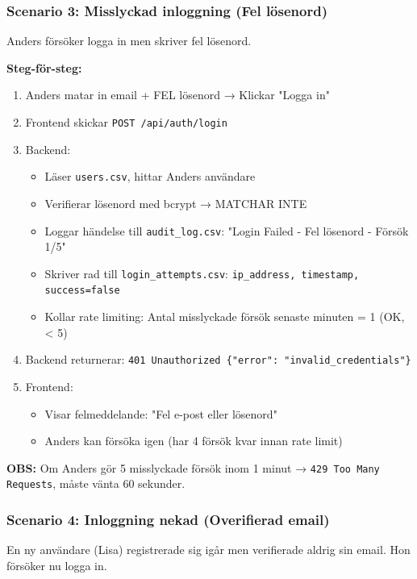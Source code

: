 \documentclass[12pt,a4paper]{article}
\begin{document}
\subsubsection{Scenario 3: Misslyckad inloggning (Fel lösenord)}

Anders försöker logga in men skriver fel lösenord.

\textbf{Steg-för-steg:}
\begin{enumerate}[noitemsep]
  \item Anders matar in email + FEL lösenord → Klickar "Logga in"
  \item Frontend skickar \texttt{POST /api/auth/login}
  \item Backend:
  \begin{itemize}[noitemsep]
    \item Läser \texttt{users.csv}, hittar Anders användare
    \item Verifierar lösenord med bcrypt → MATCHAR INTE
    \item Loggar händelse till \texttt{audit\_log.csv}: "Login Failed - Fel lösenord - Försök 1/5"
    \item Skriver rad till \texttt{login\_attempts.csv}: \texttt{ip\_address, timestamp, success=false}
    \item Kollar rate limiting: Antal misslyckade försök senaste minuten = 1 (OK, < 5)
  \end{itemize}
  \item Backend returnerar: \texttt{401 Unauthorized \{"error": "invalid\_credentials"\}}
  \item Frontend:
  \begin{itemize}[noitemsep]
    \item Visar felmeddelande: "Fel e-post eller lösenord"
    \item Anders kan försöka igen (har 4 försök kvar innan rate limit)
  \end{itemize}
\end{enumerate}

\textbf{OBS:} Om Anders gör 5 misslyckade försök inom 1 minut → \texttt{429 Too Many Requests}, måste vänta 60 sekunder.

\subsubsection{Scenario 4: Inloggning nekad (Overifierad email)}

En ny användare (Lisa) registrerade sig igår men verifierade aldrig sin email. Hon försöker nu logga in.
\end{document}
